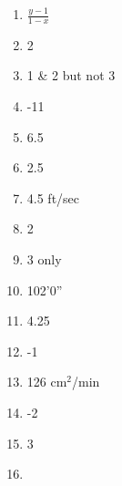 \documentclass[../uilmath.tex]{subfiles}
\begin{document}
\begin{enumerate}[label=\bfseries\arabic*.]
    \item %
    $\frac{y-1}{1-x}$

    \item %
    2

    \item %
    1 \& 2 but not 3 

    \item %
    -11

    \item %
    6.5

    \item %
    2.5

    \item %
    4.5 ft/sec 

    \item %
    2

    \item %
    3 only 

    \item %
    102'0''

    \item %
    4.25

    \item %
    -1

    \item %
    126 cm$^2$/min 

    \item %
    -2

    \item %
    3

    \item %
    
\end{enumerate}
\end{document}
